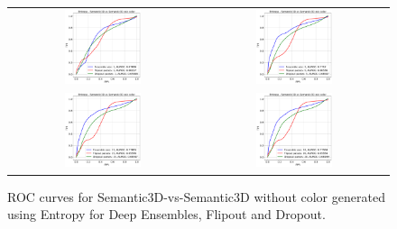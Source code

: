     \begin{figure}
        \centering
        \begin{tabular}{cc}
            \includegraphics[width = 0.42\textwidth, height= 0.3\textheight]{images/AUROC/Entropy_cnc_1.pdf} & 
            \includegraphics[width = 0.42\textwidth, height= 0.3\textheight]{images/AUROC/Entropy_cnc_5.pdf}\\ 
            \includegraphics[width = 0.42\textwidth, height= 0.3\textheight]{images/AUROC/Entropy_cnc_15.pdf} &
            \includegraphics[width = 0.42\textwidth, height= 0.3\textheight]{images/AUROC/Entropy_cnc_20.pdf} 
            \\
        \end{tabular}
        \caption{ROC curves for Semantic3D-vs-Semantic3D without color generated using Entropy for Deep Ensembles, Flipout and Dropout.}
        \label{fig:roc_ent_ood_2}
    \end{figure}    

